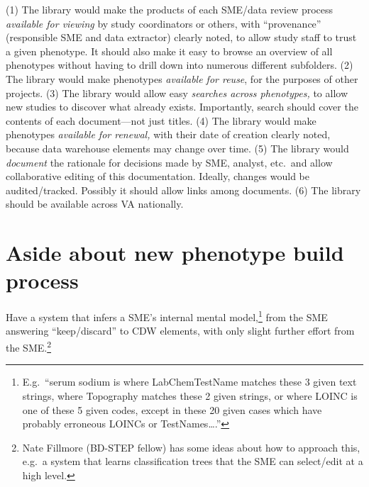 \documentclass{tufte-handout}
\begin{document}
(1) The library would make the products of each SME/data review
process \emph{available for viewing} by study coordinators or others,
with ``provenance'' (responsible SME and data extractor) clearly
noted, to allow study staff to trust a given phenotype. It should also
make it easy to browse an overview of all phenotypes without having to
drill down into numerous different subfolders. (2) The library would
make phenotypes \emph{available for reuse}, for the purposes of other
projects. (3) The library would allow easy \emph{searches across
  phenotypes,} to allow new studies to discover what already exists.
Importantly, search should cover the contents of each document---not
just titles. (4) The library would make phenotypes \emph{available for
  renewal,} with their date of creation clearly noted, because data
warehouse elements may change over time. (5) The library would
\emph{document} the rationale for decisions made by SME, analyst,
etc.\ and allow collaborative editing of this documentation. Ideally,
changes would be audited/tracked. Possibly it should allow links among
documents. (6) The library should be available across VA nationally.

\section{Aside about new phenotype build process}

Have a system that infers a SME's internal mental
model,\footnote{E.g.\ ``serum sodium is where LabChemTestName matches
  these 3 given text strings, where Topography matches these 2 given
  strings, or where LOINC is one of these 5 given codes, except in
  these 20 given cases which have probably erroneous LOINCs or
  TestNames\ldots{}.''} from the SME answering ``keep/discard'' to CDW
elements, with only slight further effort from the SME.\footnote{Nate
  Fillmore (BD-STEP fellow) has some ideas about how to approach this,
  e.g.\ a system that learns classification trees that the SME can
  select/edit at a high level.}
\end{document}
